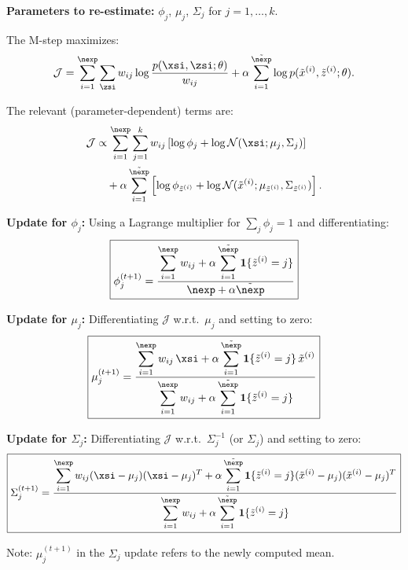 \begin{answer}
\textbf{Parameters to re-estimate:} $\phi_j$, $\mu_j$, $\Sigma_j$ for $j=1,\ldots,k$.

The M-step maximizes:
$$\mathcal{J} = \sum_{i=1}^\nexp\sum_{\zsi} w_{ij}\log\frac{p(\xsi,\zsi;\theta)}{w_{ij}} + \alpha\sum_{i=1}^{\tilde{\nexp}}\log p(\tilde{x}^{(i)},\tilde{z}^{(i)};\theta).$$

The relevant (parameter-dependent) terms are:
\begin{align*}
\mathcal{J} &\propto \sum_{i=1}^\nexp\sum_{j=1}^k w_{ij}\left[\log\phi_j + \log\mathcal{N}(\xsi;\mu_j,\Sigma_j)\right] \\
&\quad + \alpha\sum_{i=1}^{\tilde{\nexp}}\left[\log\phi_{\tilde{z}^{(i)}} + \log\mathcal{N}(\tilde{x}^{(i)};\mu_{\tilde{z}^{(i)}},\Sigma_{\tilde{z}^{(i)}})\right].
\end{align*}

\textbf{Update for $\phi_j$:} Using a Lagrange multiplier for $\sum_j\phi_j=1$ and differentiating:
$$\boxed{\phi_j^{(t+1)} = \frac{\displaystyle\sum_{i=1}^\nexp w_{ij} + \alpha\sum_{i=1}^{\tilde{\nexp}}\mathbf{1}\{\tilde{z}^{(i)}=j\}}{\nexp + \alpha\tilde{\nexp}}}$$

\textbf{Update for $\mu_j$:} Differentiating $\mathcal{J}$ w.r.t.\ $\mu_j$ and setting to zero:
$$\boxed{\mu_j^{(t+1)} = \frac{\displaystyle\sum_{i=1}^\nexp w_{ij}\,\xsi + \alpha\sum_{i=1}^{\tilde{\nexp}}\mathbf{1}\{\tilde{z}^{(i)}=j\}\,\tilde{x}^{(i)}}{\displaystyle\sum_{i=1}^\nexp w_{ij} + \alpha\sum_{i=1}^{\tilde{\nexp}}\mathbf{1}\{\tilde{z}^{(i)}=j\}}}$$

\textbf{Update for $\Sigma_j$:} Differentiating $\mathcal{J}$ w.r.t.\ $\Sigma_j^{-1}$ (or $\Sigma_j$) and setting to zero:
$$\boxed{\Sigma_j^{(t+1)} = \frac{\displaystyle\sum_{i=1}^\nexp w_{ij}(\xsi-\mu_j)(\xsi-\mu_j)^T + \alpha\sum_{i=1}^{\tilde{\nexp}}\mathbf{1}\{\tilde{z}^{(i)}=j\}(\tilde{x}^{(i)}-\mu_j)(\tilde{x}^{(i)}-\mu_j)^T}{\displaystyle\sum_{i=1}^\nexp w_{ij} + \alpha\sum_{i=1}^{\tilde{\nexp}}\mathbf{1}\{\tilde{z}^{(i)}=j\}}}$$

Note: $\mu_j^{(t+1)}$ in the $\Sigma_j$ update refers to the newly computed mean.
\end{answer}
